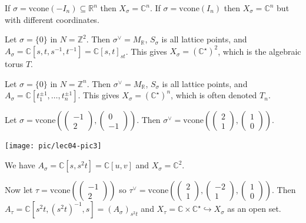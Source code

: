 \documentclass[a4paper,12pt]{amsart}
\newcommand{\ZZ}{\mathbb{Z}}
\newcommand{\RR}{\mathbb{R}}
\newcommand{\CC}{\mathbb{C}}
\begin{document}
\begin{Eg}
If $\sigma = \mathrm{vcone}(-I_n) \subseteq \RR^n$ then $X_\sigma = \CC^n$.
If $\sigma = \mathrm{vcone}(I_n)$ then $X_\sigma = \CC^n$ but with different coordinates.
\end{Eg}

\begin{Eg}
Let $\sigma = \{0\}$ in $N = \ZZ^2$.
Then $\sigma^\vee = M_\RR$, $S_\sigma$ is all lattice points, and $A_\sigma = \CC[s,t,s^{-1},t^{-1}] = \CC[s, t]_{st}$.
This gives $X_\sigma = (\CC^\star)^2$, which is the algebraic torus $T$.
\end{Eg}

\begin{Eg}
Let $\sigma = \{0\}$ in $N = \ZZ^n$.
Then $\sigma^\vee = M_\RR$, $S_\sigma$ is all lattice points, and $A_\sigma = \CC[t_1^{\pm 1}, \dots, t_n^{\pm 1}]$.
This gives $X_\sigma = (\CC^\star)^n$, which is often denoted $T_n$.
\end{Eg}

\begin{Eg}
Let $\sigma = \mathrm{vcone}\left(\begin{pmatrix}-1\\2\end{pmatrix}, \begin{pmatrix}0\\-1\end{pmatrix}\right)$.
Then $\sigma^\vee = \mathrm{vcone}\left(\begin{pmatrix}2\\1\end{pmatrix}, \begin{pmatrix}1\\0\end{pmatrix}\right)$.

\texttt{[image: pic/lec04-pic3]}

We have $A_\sigma = \CC[s, s^2t] = \CC[u, v]$ and $X_\sigma = \CC^2$.

Now let $\tau = \mathrm{vcone}\left(\begin{pmatrix}-1\\2\end{pmatrix}\right)$ so $\tau^\vee = \mathrm{vcone}\left(\begin{pmatrix}2\\1\end{pmatrix}, \begin{pmatrix}-2\\1\end{pmatrix}, \begin{pmatrix}1\\0\end{pmatrix}\right)$.
Then $A_\tau = \CC[s^2t, (s^2t)^{-1}, s] = (A_\sigma)_{s^2t}$ and $X_\tau = \CC \times \CC^\star \hookrightarrow X_\sigma$ as an open set.
\end{Eg}
\end{document}
